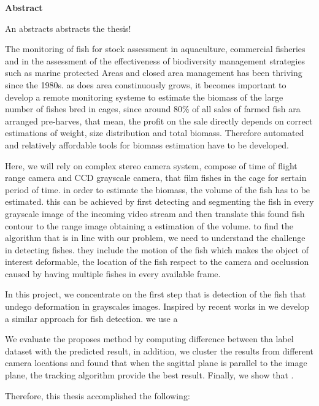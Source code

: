 

\clearemptydoublepage
{}
{}	





\vspace*{2cm}
\begin{center}
{\Large \bf Abstract}
\end{center}
\vspace{1cm}

An abstracts abstracts the thesis!

The monitoring of fish for stock assessment in aquaculture, commercial fisheries and in the assessment of the effectiveness of biodiversity management strategies such as marine protected Areas and closed area management has been thriving since the 1980s. as does area constinuously   grows, it becomes important to develop a remote monitoring systeme to estimate the biomass of the large number of fishes bred in cages, since around 80\% of all sales of farmed fish ara arranged pre-harves, that mean, the profit on the sale directly depends on correct estimations of weight, size distribution and total biomass. Therefore automated and relatively affordable tools for biomass estimation have to be developed.

Here, we will rely on complex stereo camera system, compose of time of flight range camera and CCD grayscale camera, that film fishes in the cage for sertain period of time. in order to estimate the biomass, the volume of the fish has to be estimated. this can be achieved by first detecting and segmenting the fish in every grayscale image of the incoming video stream and then translate this found fish contour  to the range image obtaining a estimation of the volume. to find the algorithm that is in line with our problem, we need to understand the challenge in detecting fishes. they include the motion of the fish which makes the object of interest deformable, the location of the fish respect to the camera and occlussion caused by having multiple fishes in every available frame.

In this project, we concentrate on the first step that is detection of the fish that undego deformation in grayscales images. Inspired by recent works in  
we develop a similar approach for fish detection. we use a 

We evaluate the proposes method by computing difference between tha label dataset with the predicted result, in addition, we cluster the results from different camera locations and found that when the sagittal plane is parallel to the image plane, the tracking algorithm provide the best result. Finally, we show that .

Therefore, this thesis accomplished the following: 
